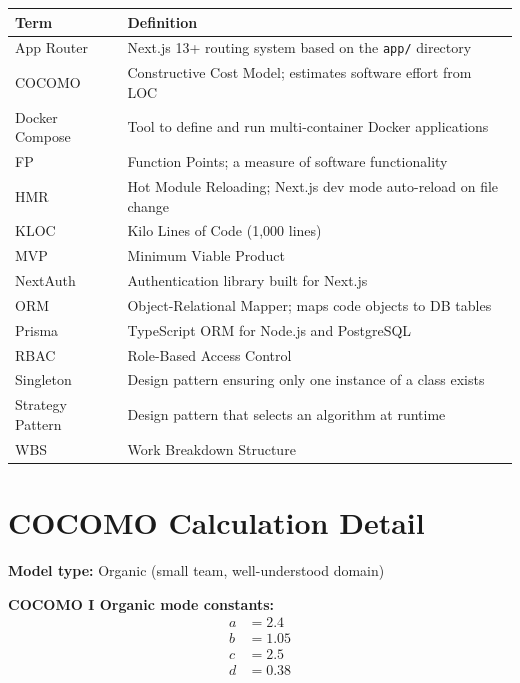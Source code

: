 \documentclass[12pt,a4paper]{report}
\begin{document}
\begin{table}[H]
  \centering
  \begin{tabularx}{\textwidth}{L{3cm} X}
    \toprule
    \textbf{Term} & \textbf{Definition} \\
    \midrule
    App Router       & Next.js 13+ routing system based on the \texttt{app/} directory \\
    COCOMO           & Constructive Cost Model; estimates software effort from LOC \\
    Docker Compose   & Tool to define and run multi-container Docker applications \\
    FP               & Function Points; a measure of software functionality \\
    HMR              & Hot Module Reloading; Next.js dev mode auto-reload on file change \\
    KLOC             & Kilo Lines of Code (1,000 lines) \\
    MVP              & Minimum Viable Product \\
    NextAuth         & Authentication library built for Next.js \\
    ORM              & Object-Relational Mapper; maps code objects to DB tables \\
    Prisma           & TypeScript ORM for Node.js and PostgreSQL \\
    RBAC             & Role-Based Access Control \\
    Singleton        & Design pattern ensuring only one instance of a class exists \\
    Strategy Pattern & Design pattern that selects an algorithm at runtime \\
    WBS              & Work Breakdown Structure \\
    \bottomrule
  \end{tabularx}
\end{table}

\chapter{COCOMO Calculation Detail}

\textbf{Model type:} Organic (small team, well-understood domain)

\textbf{COCOMO I Organic mode constants:}
\begin{align*}
  a &= 2.4 \\
  b &= 1.05 \\
  c &= 2.5 \\
  d &= 0.38
\end{align*}
\end{document}
